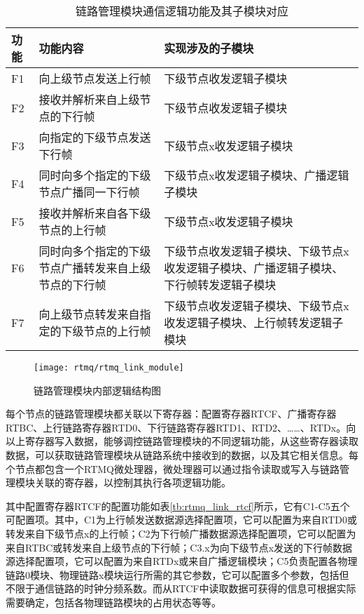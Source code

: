 \begin{table}
    \centering
    \caption[链路管理模块通信逻辑功能及其子模块对应]{链路管理模块通信逻辑功能及其子模块对应\label{tb:rtmq_link_module}}
    \begin{tabular}{C{1.5cm}|C{5.5cm}|C{6cm}}
        \toprule
        功能 & 功能内容 & 实现涉及的子模块\\
        \midrule
        F1 & 向上级节点发送上行帧 & 下级节点收发逻辑子模块\\
        \hline
        F2 & 接收并解析来自上级节点的下行帧 & 下级节点收发逻辑子模块\\
        \hline
        F3 & 向指定的下级节点发送下行帧 & 下级节点x收发逻辑子模块\\
        \hline
        F4 & 同时向多个指定的下级节点广播同一下行帧 & 下级节点x收发逻辑子模块、广播逻辑子模块\\
        \hline
        F5 & 接收并解析来自各下级节点的上行帧 & 下级节点x收发逻辑子模块\\
        \hline
        F6 & 同时向多个指定的下级节点广播转发来自上级节点的下行帧 & 下级节点收发逻辑子模块、下级节点x收发逻辑子模块、广播逻辑子模块、下行帧转发逻辑子模块\\
        \hline
        F7 & 向上级节点转发来自指定的下级节点的上行帧 & 下级节点收发逻辑子模块、下级节点x收发逻辑子模块、上行帧转发逻辑子模块\\
        \bottomrule
    \end{tabular}
\end{table}


\begin{figure}
    \centering
    \caption[链路管理模块内部逻辑结构图]{链路管理模块内部逻辑结构图\label{fig:rtmq_link_module}}
    \texttt{[image: rtmq/rtmq\_link\_module]}
\end{figure}


每个节点的链路管理模块都关联以下寄存器：配置寄存器RTCF、广播寄存器RTBC、上行链路寄存器RTD0、下行链路寄存器RTD1、RTD2、……、RTDx。向以上寄存器写入数据，能够调控链路管理模块的不同逻辑功能，从这些寄存器读取数据，可以获取链路管理模块从链路系统中接收到的数据，以及其它相关信息。每个节点都包含一个RTMQ微处理器，微处理器可以通过指令读取或写入与链路管理模块关联的寄存器，以控制其执行各项逻辑功能。

其中配置寄存器RTCF的配置功能如表\ref{tb:rtmq_link_rtcf}所示，它有C1-C5五个可配置项。其中，C1为上行帧发送数据源选择配置项，它可以配置为来自RTD0或转发来自下级节点x的上行帧；C2为下行帧广播数据源选择配置项，它可以配置为来自RTBC或转发来自上级节点的下行帧；C3.x为向下级节点x发送的下行帧数据源选择配置项，它可以配置为来自RTDx或来自广播逻辑模块；C5负责配置各物理链路0模块、物理链路x模块运行所需的其它参数，它可以配置多个参数，包括但不限于通信链路的时钟分频系数。而从RTCF中读取数据可获得的信息可根据实际需要确定，包括各物理链路模块的占用状态等等。

